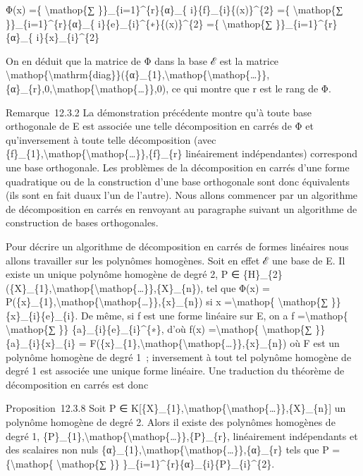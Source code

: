 \documentclass[]{article}
\begin{document}
Φ(x) =\{ \textbackslash{}mathop\{∑ \}\}\_\{i=1\}\^{}\{r\}\{α\}\_\{
i\}\{f\}\_\{i\}\{(x)\}\^{}\{2\} =\{ \textbackslash{}mathop\{∑
\}\}\_\{i=1\}\^{}\{r\}\{α\}\_\{ i\}\{e\}\_\{i\}\^{}\{∗\}\{(x)\}\^{}\{2\}
=\{ \textbackslash{}mathop\{∑ \}\}\_\{i=1\}\^{}\{r\}\{α\}\_\{
i\}\{x\}\_\{i\}\^{}\{2\}

On en déduit que la matrice de Φ dans la base ℰ est la matrice
\textbackslash{}mathop\{\textbackslash{}mathrm\{diag\}\}(\{α\}\_\{1\},\textbackslash{}mathop\{\textbackslash{}mathop\{\ldots{}\}\},\{α\}\_\{r\},0,\textbackslash{}mathop\{\textbackslash{}mathop\{\ldots{}\}\},0),
ce qui montre que r est le rang de Φ.

Remarque~12.3.2 La démonstration précédente montre qu'à toute base
orthogonale de E est associée une telle décomposition en carrés de Φ et
qu'inversement à toute telle décomposition (avec
\{f\}\_\{1\},\textbackslash{}mathop\{\textbackslash{}mathop\{\ldots{}\}\},\{f\}\_\{r\}
linéairement indépendantes) correspond une base orthogonale. Les
problèmes de la décomposition en carrés d'une forme quadratique ou de la
construction d'une base orthogonale sont donc équivalents (ils sont en
fait duaux l'un de l'autre). Nous allons commencer par un algorithme de
décomposition en carrés en renvoyant au paragraphe suivant un algorithme
de construction de bases orthogonales.

Pour décrire un algorithme de décomposition en carrés de formes
linéaires nous allons travailler sur les polynômes homogènes. Soit en
effet ℰ une base de E. Il existe un unique polynôme homogène de degré 2,
P ∈
\{H\}\_\{2\}(\{X\}\_\{1\},\textbackslash{}mathop\{\textbackslash{}mathop\{\ldots{}\}\},\{X\}\_\{n\}),
tel que Φ(x) =
P(\{x\}\_\{1\},\textbackslash{}mathop\{\textbackslash{}mathop\{\ldots{}\}\},\{x\}\_\{n\})
si x =\textbackslash{}mathop\{ \textbackslash{}mathop\{∑ \}\}
\{x\}\_\{i\}\{e\}\_\{i\}. De même, si f est une forme linéaire sur E, on
a f =\textbackslash{}mathop\{ \textbackslash{}mathop\{∑ \}\}
\{a\}\_\{i\}\{e\}\_\{i\}\^{}\{∗\}, d'où f(x) =\textbackslash{}mathop\{
\textbackslash{}mathop\{∑ \}\} \{a\}\_\{i\}\{x\}\_\{i\} =
F(\{x\}\_\{1\},\textbackslash{}mathop\{\textbackslash{}mathop\{\ldots{}\}\},\{x\}\_\{n\})
où F est un polynôme homogène de degré 1~; inversement à tout tel
polynôme homogène de degré 1 est associée une unique forme linéaire. Une
traduction du théorème de décomposition en carrés est donc

Proposition~12.3.8 Soit P ∈
K{[}\{X\}\_\{1\},\textbackslash{}mathop\{\textbackslash{}mathop\{\ldots{}\}\},\{X\}\_\{n\}{]}
un polynôme homogène de degré 2. Alors il existe des polynômes homogènes
de degré 1,
\{P\}\_\{1\},\textbackslash{}mathop\{\textbackslash{}mathop\{\ldots{}\}\},\{P\}\_\{r\},
linéairement indépendants et des scalaires non nuls
\{α\}\_\{1\},\textbackslash{}mathop\{\textbackslash{}mathop\{\ldots{}\}\},\{α\}\_\{r\}
tels que P =\{\textbackslash{}mathop\{ \textbackslash{}mathop\{∑ \}\}
\}\_\{i=1\}\^{}\{r\}\{α\}\_\{i\}\{P\}\_\{i\}\^{}\{2\}.
\end{document}
